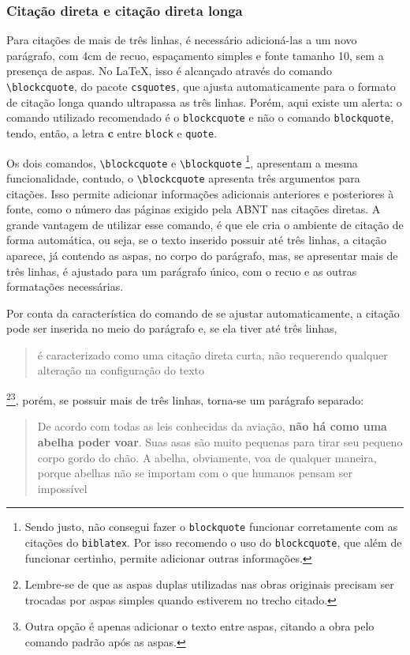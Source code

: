 \subsubsection{Citação direta e citação direta longa}
Para citações de mais de três linhas, é necessário adicioná-las a um novo parágrafo, com 4cm de recuo, espaçamento simples e fonte tamanho 10, sem a presença de aspas. No \LaTeX{}, isso é alcançado através do comando \verb|\blockcquote|, do pacote \verb|csquotes|, que ajusta automaticamente para o formato de citação longa quando ultrapassa as três linhas. Porém, aqui existe um alerta: o comando utilizado recomendado é o \texttt{blockcquote} e não o comando \texttt{blockquote}, tendo, então, a letra \textbf{c} entre \texttt{block} e \texttt{quote}.

Os dois comandos, \verb|\blockcquote| e \verb|\blockquote|%
\footnote{Sendo justo, não consegui fazer o \texttt{blockquote} funcionar corretamente com as citações do \texttt{biblatex}. Por isso recomendo o uso do \texttt{blockcquote}, que além de funcionar certinho, permite adicionar outras informações.}, 
apresentam a mesma funcionalidade, contudo, o \verb|\blockcquote| apresenta três argumentos para citações. Isso permite adicionar informações adicionais anteriores e posteriores à fonte, como o número das páginas exigido pela ABNT nas citações diretas. A grande vantagem de utilizar esse comando, é que ele cria o ambiente de citação de forma automática, ou seja, se o texto inserido possuir até três linhas, a citação aparece, já contendo as aspas, no corpo do parágrafo, mas, se apresentar mais de três linhas, é ajustado para um parágrafo único, com o recuo e as outras formatações necessárias. 

Por conta da característica do comando de se ajustar automaticamente, a citação pode ser inserida no meio do parágrafo e, se ela tiver até três linhas, \blockcquote[p. 58]{livro:iffar-guia-normalizacao-2022}{é caracterizado como uma citação direta curta, não requerendo qualquer alteração na configuração do texto}\footnote{Lembre-se de que as aspas duplas utilizadas nas obras originais precisam ser trocadas por aspas simples quando estiverem no trecho citado.}\footnote{Outra opção é apenas adicionar o texto entre aspas, citando a obra pelo comando padrão após as aspas.}, porém, se possuir mais de três linhas, torna-se um parágrafo separado:
\blockcquote[tradução nossa, grifo nosso]{filme:bee-movie}{De acordo com todas as leis conhecidas da aviação, \textbf{não há como uma abelha poder voar}. Suas asas são muito pequenas para tirar seu pequeno corpo gordo do chão. A abelha, obviamente, voa de qualquer maneira, porque abelhas não se importam com o que humanos pensam ser impossível}

